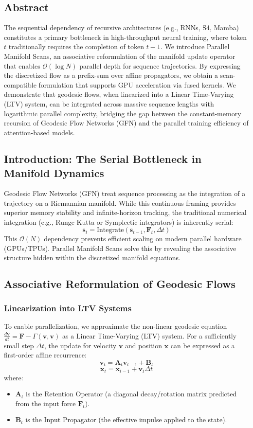 \documentclass{article}
\numberwithin{equation}{section}
\begin{document}
\subsection*{Abstract}
The sequential dependency of recursive architectures (e.g., RNNs, S4, Mamba) constitutes a primary bottleneck in high-throughput neural training, where token $t$ traditionally requires the completion of token $t-1$. We introduce Parallel Manifold Scans, an associative reformulation of the manifold update operator that enables $\mathcal{O}(\log N)$ parallel depth for sequence trajectories. By expressing the discretized flow as a prefix-sum over affine propagators, we obtain a scan-compatible formulation that supports GPU acceleration via fused kernels. We demonstrate that geodesic flows, when linearized into a Linear Time-Varying (LTV) system, can be integrated across massive sequence lengths with logarithmic parallel complexity, bridging the gap between the constant-memory recursion of Geodesic Flow Networks (GFN) and the parallel training efficiency of attention-based models.

\subsection{Introduction: The Serial Bottleneck in Manifold Dynamics}
Geodesic Flow Networks (GFN) treat sequence processing as the integration of a trajectory on a Riemannian manifold. While this continuous framing provides superior memory stability and infinite-horizon tracking, the traditional numerical integration (e.g., Runge-Kutta or Symplectic integrators) is inherently serial:
\[
\mathbf{s}_{t} = \text{Integrate}(\mathbf{s}_{t-1}, \mathbf{F}_t, \Delta t)
\]
This $\mathcal{O}(N)$ dependency prevents efficient scaling on modern parallel hardware (GPUs/TPUs). Parallel Manifold Scans solve this by revealing the associative structure hidden within the discretized manifold equations.

\subsection{Associative Reformulation of Geodesic Flows}
\subsubsection{Linearization into LTV Systems}
To enable parallelization, we approximate the non-linear geodesic equation $\frac{d\mathbf{v}}{dt} = \mathbf{F} - \Gamma(\mathbf{v}, \mathbf{v})$ as a Linear Time-Varying (LTV) system. For a sufficiently small step $\Delta t$, the update for velocity $\mathbf{v}$ and position $\mathbf{x}$ can be expressed as a first-order affine recurrence:
\[
\mathbf{v}_t = \mathbf{A}_t \mathbf{v}_{t-1} + \mathbf{B}_t
\]
\[
\mathbf{x}_t = \mathbf{x}_{t-1} + \mathbf{v}_t \Delta t
\]
where:
\begin{itemize}
\item $\mathbf{A}_t$ is the Retention Operator (a diagonal decay/rotation matrix predicted from the input force $\mathbf{F}_t$).
\item $\mathbf{B}_t$ is the Input Propagator (the effective impulse applied to the state).
\end{itemize}
\end{document}
